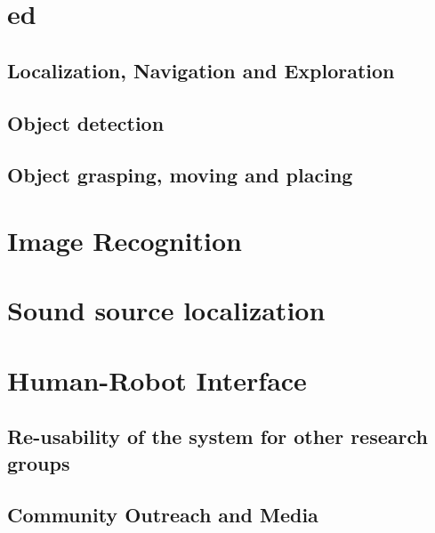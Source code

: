 \documentclass[runningheads,a4paper]{llncs}
\begin{document}
\section{\acrfull{ed}}


\subsection{Localization, Navigation and Exploration}


\subsection{Object detection}


\subsection{Object grasping, moving and placing}


\section{Image Recognition}


\section{Sound source localization}


%

\section{Human-Robot Interface}



\subsection{Re-usability of the system for other research groups}


\subsection{Community Outreach and Media}

\end{document}
